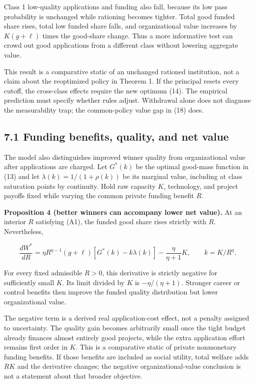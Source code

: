 \documentclass[
  11pt,
]{article}
\begin{document}
Class 1 low-quality applications and funding also fall, because its low
pass probability is unchanged while rationing becomes tighter. Total
good funded share rises, total low funded share falls, and
organizational value increases by \(K(g+\ell)\) times the good-share
change. Thus a more informative test can crowd out good applications
from a different class without lowering aggregate value.

This result is a comparative static of an unchanged rationed
institution, not a claim about the reoptimized policy in Theorem 1. If
the principal resets every cutoff, the cross-class effects require the
new optimum (14). The empirical prediction must specify whether rules
adjust. Withdrawal alone does not diagnose the measurability trap; the
common-policy value gap in (18) does.

\subsection{7.1 Funding benefits, quality, and net
value}\label{funding-benefits-quality-and-net-value}

The model also distinguishes improved winner quality from organizational
value after applications are charged. Let \(G^*(k)\) be the optimal
good-mass function in (13) and let \(\lambda(k)=1/(1+\rho(k))\) be its
marginal value, including at class saturation points by continuity. Hold
raw capacity \(K\), technology, and project payoffs fixed while varying
the common private funding benefit \(R\).

\textbf{Proposition 4 (better winners can accompany lower net value).}
At an interior \(R\) satisfying (A1), the funded good share rises
strictly with \(R\). Nevertheless,

\[\frac{dW^*}{dR}=\eta R^{\eta-1}(g+\ell)
\left[G^*(k)-k\lambda(k)\right]-\frac{\eta}{\eta+1}K,
\qquad k=K/R^\eta. \tag{21}\]

For every fixed admissible \(R>0\), this derivative is strictly negative
for sufficiently small \(K\). Its limit divided by \(K\) is
\(-\eta/(\eta+1)\). Stronger career or control benefits then improve the
funded quality distribution but lower organizational value.

The negative term is a derived real application-cost effect, not a
penalty assigned to uncertainty. The quality gain becomes arbitrarily
small once the tight budget already finances almost entirely good
projects, while the extra application effort remains first order in
\(K\). This is a comparative static of private nonmonetary funding
benefits. If those benefits are included as social utility, total
welfare adds \(RK\) and the derivative changes; the negative
organizational-value conclusion is not a statement about that broader
objective.
\end{document}
